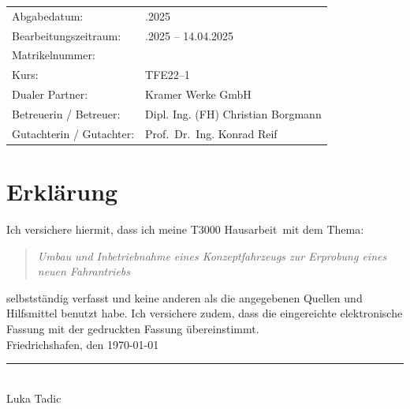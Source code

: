 \documentclass[a4paper, 12pt]{article} %
\newcommand{\titel}{Umbau und Inbetriebnahme eines Konzeptfahrzeugs zur Erprobung eines neuen Fahrantriebs}
\newcommand{\arbeit}{T3000 Hausarbeit}
\newcommand{\autor}{Luka Tadic}
\newcommand{\abgabe}{14.04.2025}
\newcommand{\bearbeitungszeitraum}{19.01.2025 – 14.04.2025}
\newcommand{\matrikelnr}{5726700}
\newcommand{\kurs}{TFE22–1} %
\newcommand{\firma}{Kramer Werke GmbH}
\newcommand{\betreuerfirma}{Dipl. Ing. (FH) Christian Borgmann}
\newcommand{\gutachterdhbw}{Prof.\ Dr.\ Ing. Konrad Reif}
\begin{document}
\begin{titlepage}
\begin{center}
\end{center}

\begin{center}
{\fontsize{12pt}{14pt}\selectfont
\begin{tabular}{ll}
Abgabedatum:                    & \quad \abgabe\\  
Bearbeitungszeitraum:           & \quad \bearbeitungszeitraum\\  
Matrikelnummer:                 & \quad \matrikelnr\\ 
Kurs:                           & \quad \kurs\\ 
Dualer Partner:                 & \quad \firma\\ %
Betreuerin / Betreuer:          & \quad \betreuerfirma\\  
Gutachterin / Gutachter:        & \quad \gutachterdhbw\\ [2ex]
\end{tabular}
}
\end{center}

\end{titlepage}

\clearpage

\pagestyle{scrheadings}  %
\hypersetup{pageanchor=true}



\section*{Erklärung}
\begin{spacing}{1.8}  %
    \fontsize{14pt}{14pt}\selectfont

Ich versichere hiermit, dass ich meine \arbeit\ mit dem Thema:

\begin{quote}
    \textit{\titel}
\end{quote}

selbstständig verfasst und keine anderen als die angegebenen Quellen und Hilfsmittel benutzt habe.  
Ich versichere zudem, dass die eingereichte elektronische Fassung mit der gedruckten Fassung übereinstimmt.\\[6ex]

Friedrichshafen, den \today \\[1ex]
\rule[-0.2cm]{5cm}{0.5pt} \\  
\autor\\[10ex]

\rmfamily

\end{spacing}
\clearpage
\end{document}
